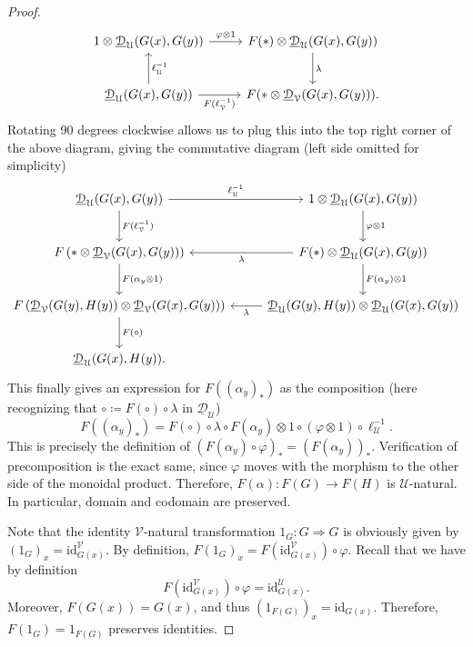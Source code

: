 \begin{proof}
	\[\begin{tikzcd}[row sep = 2.5em, column sep = 2.5em]
	1\otimes \underline{\mathcal{D} } _\mathcal{U} (G(x),G(y))\ar[" \varphi \otimes 1", r]  & F(*)\otimes \underline{\mathcal{D} } _\mathcal{U} (G(x),G(y))\ar[" \lambda ", d]  \\
	\underline{\mathcal{D} } _\mathcal{U} (G(x),G(y))\ar[" F(\ell _\mathcal{V} ^{-1} ) "', r] \ar[" \ell _\mathcal{U}^{-1}   "', u]  & F(*\otimes \underline{\mathcal{D} } _\mathcal{V} (G(x),G(y))).
	\end{tikzcd}\]
	Rotating 90 degrees clockwise allows us to plug this into the top right corner of the above diagram, giving the commutative diagram (left side omitted for simplicity)
	\[\begin{tikzcd}[row sep = 2.5em, column sep = 2.5em]
		\underline{\mathcal{D} } _\mathcal{U} (G(x),G(y))\ar[" F(\ell _\mathcal{V} ^{-1}) ", d]\ar[" \ell _\mathcal{U} ^{-1}  ", r] & 1\otimes \underline{\mathcal{D} } _\mathcal{U} (G(x),G(y))\ar[" \varphi \otimes 1", d]  \\
		F\left( *\otimes \underline{\mathcal{D} } _\mathcal{V} (G(x),G(y)) \right) \ar[" F(\alpha_y \otimes 1) ", d] & F(*)\otimes \underline{\mathcal{D} } _\mathcal{U} (G(x),G(y))\ar[" F(\alpha_y)\otimes 1 ", d] \ar[" \lambda ", l] \\
		F\left( \underline{\mathcal{D} } _\mathcal{V} (G(y),H(y))\otimes \underline{\mathcal{D} } _\mathcal{V} (G(x),G(y)) \right) \ar[" F(\circ ) ", d] & \underline{\mathcal{D} } _\mathcal{U} (G(y),H(y))\otimes \underline{\mathcal{D} } _\mathcal{U} (G(x),G(y))\ar[" \lambda ", l] \\
	\underline{\mathcal{D} } _\mathcal{U} (G(x),H(y)).
	\end{tikzcd}\]
	This finally gives an expression for $F((\alpha_y)_*)$ as the composition (here recognizing that $\circ \coloneqq F(\circ )\circ \lambda$ in $\underline{\mathcal{D} } _\mathcal{U} $)
	\[
		F((\alpha_y)_*)=F(\circ )\circ \lambda\circ F(\alpha_y)\otimes 1 \circ (\varphi \otimes 1)\circ \ell _\mathcal{U} ^{-1} 
	.\]
	This is precisely the definition of $(F(\alpha_y)\circ \varphi)_*=(F(\alpha_y))_*$. Verification of precomposition is the exact same, since $\varphi$ moves with the morphism to the other side of the monoidal product. Therefore, $F(\alpha): F(G) \to F(H)$ is $\mathcal{U} $-natural. In particular, domain and codomain are preserved.

	Note that the identity $\mathcal{V} $-natural transformation $1_G : G \Rightarrow G$ is obviously given by $(1_G)_x = \mathrm{id}^{\mathcal{V} }_{G(x)} $. By definition, $F(1_G)_x=F(\mathrm{id}^{\mathcal{V} }_{G(x)} )\circ \varphi$. Recall that we have by definition
	\[
		F(\mathrm{id}^{\mathcal{V} } _{G(x)} )\circ \varphi = \mathrm{id} ^{\mathcal{U} } _{G(x)} 
	.\]
	Moreover, $F(G(x))=G(x)$, and thus $(1_{F(G)} )_x=\mathrm{id} _{G(x)} $. Therefore, $F(1_G)=1_{F(G)} $ preserves identities.


\end{proof}

